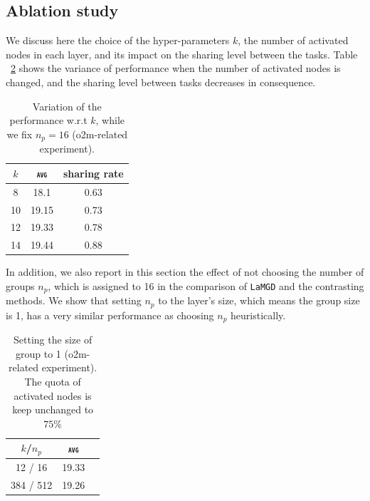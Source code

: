 \documentclass[11pt]{article}
\newcommand{\domain}[1]{\texttt{\textsc{#1}}}
\newcommand{\system}[1]{\texttt{{#1}}}
\begin{document}
\subsection{Ablation study}
We discuss here the choice of the hyper-parameters $k$, the number of activated nodes in each layer, and its impact on the sharing level between the tasks. Table ~\ref{tab:K} shows the variance of performance when the number of activated nodes is changed, and the sharing level between tasks decreases in consequence.
\begin{table}[h!]
  \centering
  \begin{tabular}{|c|c|c|} \hline
    $k$ & \domain{avg} & sharing rate \\ \hline 
    8 & 18.1 & 0.63\\
    10 & 19.15 & 0.73\\
    12 & 19.33 & 0.78\\
    14 & 19.44 & 0.88\\
    \hline
  \end{tabular}
  \caption{Variation of the performance w.r.t $k$, while we fix $n_p=16$ (o2m-related experiment).}
  \label{tab:K}
\end{table}
In addition, we also report in this section the effect of not choosing the number of groups $n_p$, which is assigned to 16 in the comparison of \system{LaMGD} and the contrasting methods. We show that setting $n_p$ to the layer's size, which means the group size is 1, has a very similar performance as choosing $n_p$ heuristically. 
\begin{table}[h!]
  \centering
  \begin{tabular}{|c|c|c|} \hline
    $k$/$n_p$ & \domain{avg} \\ \hline 
    12 / 16 & 19.33\\
    384 / 512 & 19.26\\
    \hline
  \end{tabular}
  \caption{Setting the size of group to 1 (o2m-related experiment). The quota of activated nodes is keep unchanged to $75$\%}
  \label{tab:K}
\end{table}
\end{document}
